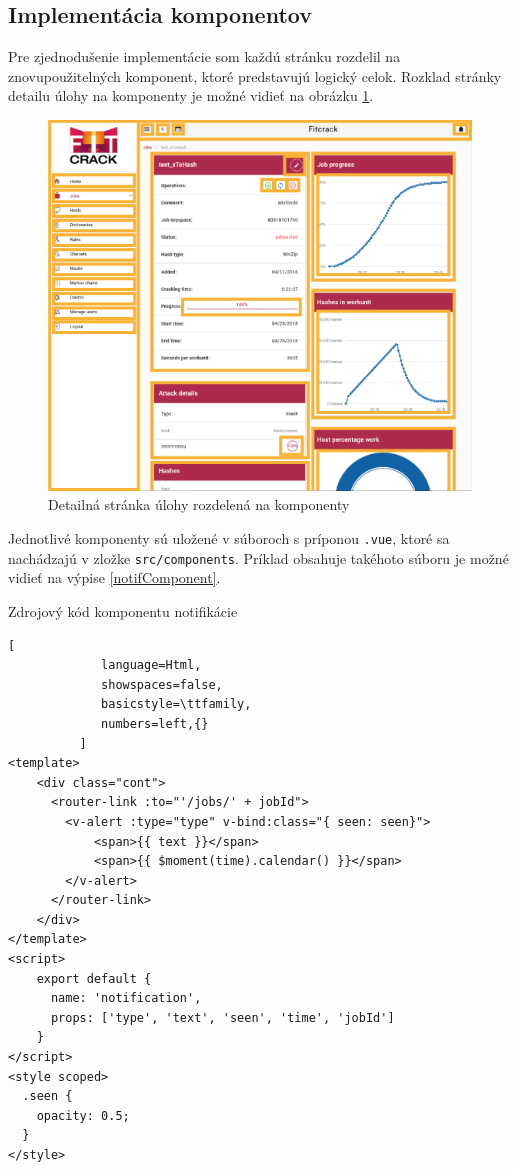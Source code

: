 \documentclass[slovak]{fitthesis}
\begin{document}
\subsection{Implementácia komponentov}
Pre zjednodušenie implementácie som každú stránku rozdelil na znovupoužitelných komponent, ktoré predstavujú logický celok. Rozklad stránky detailu úlohy na komponenty je možné vidieť na obrázku \ref{fig:komponenty}.
\begin{figure}
    \centering
    \includegraphics[scale=0.55]{obrazky/komponenty.png}
    \caption{Detailná stránka úlohy rozdelená na komponenty}
    \label{fig:komponenty}
\end{figure}
Jednotlivé komponenty sú uložené v súboroch s príponou \texttt{.vue}, ktoré sa nachádzajú v zložke \texttt{src/components}. Príklad obsahuje takéhoto súboru je možné vidieť na výpise \ref{notifComponent}.

\begin{algorithm}
  \caption{Zdrojový kód komponentu notifikácie}
  \label{notifComponent}
  \begin{lstlisting}[
             language=Html,
             showspaces=false,
             basicstyle=\ttfamily,
             numbers=left,{}
          ]
<template>
    <div class="cont">
      <router-link :to="'/jobs/' + jobId">
        <v-alert :type="type" v-bind:class="{ seen: seen}">
            <span>{{ text }}</span>
            <span>{{ $moment(time).calendar() }}</span>
        </v-alert>
      </router-link>
    </div>
</template>
<script>
    export default {
      name: 'notification',
      props: ['type', 'text', 'seen', 'time', 'jobId']
    }
</script>
<style scoped>
  .seen {
    opacity: 0.5;
  }
</style>
  \end{lstlisting}
\end{algorithm}
\end{document}
